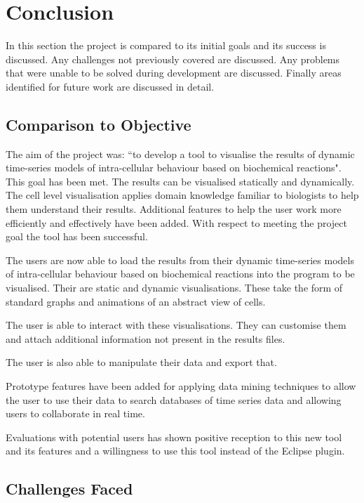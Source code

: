\chapter{Conclusion}

In this section the project is compared to its initial goals and its success is discussed.  Any challenges not previously covered are discussed.  Any problems that were unable to be solved during development are discussed.  Finally areas identified for future work are discussed in detail.

\section{Comparison to Objective}

The aim of the project was: ``to develop a tool to visualise the results of dynamic time-series models of intra-cellular behaviour based on biochemical reactions".  This goal has been met.  The results can be visualised statically and dynamically.  The cell level visualisation applies domain knowledge familiar to biologists to help them understand their results.  Additional features to help the user work more efficiently and effectively have been added.  With respect to meeting the project goal the tool has been successful.

The users are now able to load the results from their dynamic time-series models of intra-cellular behaviour based on biochemical reactions into the program to be visualised.  Their are static and dynamic visualisations.  These take the form of standard graphs and animations of an abstract view of cells.

The user is able to interact with these visualisations.  They can customise them and attach additional information not present in the results files.

The user is also able to manipulate their data and export that.

Prototype features have been added for applying data mining techniques to allow the user to use their data to search databases of time series data and allowing users to collaborate in real time.

Evaluations with potential users has shown positive reception to this new tool and its features and a willingness to use this tool instead of the Eclipse plugin.

\section{Challenges Faced}


